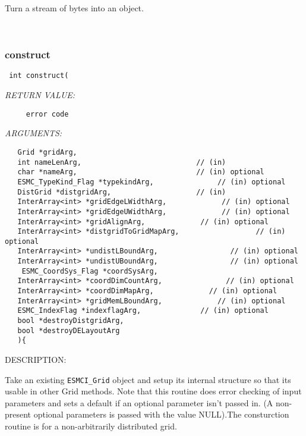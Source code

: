       Turn a stream of bytes into an object.
   
 
\mbox{}\hrulefill\ 
 
\subsubsection [construct] {construct}


  
\begin{verbatim} int construct(\end{verbatim}{\em RETURN VALUE:}
\begin{verbatim}     error code\end{verbatim}{\em ARGUMENTS:}
\begin{verbatim}   Grid *gridArg, 
   int nameLenArg,                           // (in)
   char *nameArg,                            // (in) optional
   ESMC_TypeKind_Flag *typekindArg,               // (in) optional
   DistGrid *distgridArg,                    // (in) 
   InterArray<int> *gridEdgeLWidthArg,             // (in) optional
   InterArray<int> *gridEdgeUWidthArg,             // (in) optional
   InterArray<int> *gridAlignArg,             // (in) optional
   InterArray<int> *distgridToGridMapArg,                  // (in) optional
   InterArray<int> *undistLBoundArg,                 // (in) optional
   InterArray<int> *undistUBoundArg,                 // (in) optional
    ESMC_CoordSys_Flag *coordSysArg, 
   InterArray<int> *coordDimCountArg,               // (in) optional
   InterArray<int> *coordDimMapArg,             // (in) optional
   InterArray<int> *gridMemLBoundArg,             // (in) optional
   ESMC_IndexFlag *indexflagArg,              // (in) optional
   bool *destroyDistgridArg,
   bool *destroyDELayoutArg
   ){\end{verbatim}
{\sf DESCRIPTION:\\ }


     Take an existing {\tt ESMCI_Grid} object and setup its internal structure
     so that its usable in other Grid methods. Note that this routine
     does error checking of input parameters and sets a default if an optional
     parameter isn't passed in. (A non-present optional parameters is passed with 
     the value NULL).The consturction routine is for a non-arbitrarily distributed
     grid. 
 
